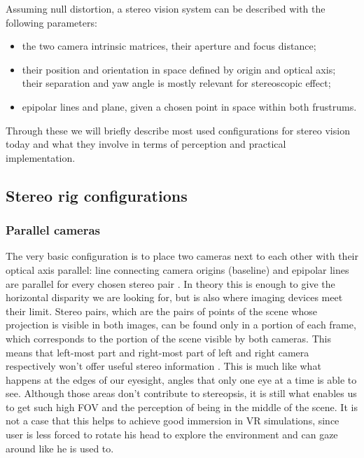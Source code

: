 Assuming null distortion, a stereo vision system can be described \cite{book_cv} with the following parameters:
\begin{itemize}
\item the two camera intrinsic matrices, their aperture and focus distance;
\item their position and orientation in space defined by origin and optical axis; their separation and yaw angle is mostly relevant for stereoscopic effect;
\item epipolar lines and plane, given a chosen point in space within both frustrums.
\end{itemize}
Through these we will briefly describe most used configurations for stereo vision today and what they involve in terms of perception and practical implementation.

\subsection{Stereo rig configurations}

\subsubsection{Parallel cameras}
The very basic configuration is to place two cameras next to each other with their optical axis parallel: line connecting camera origins (baseline) and epipolar lines are parallel for every chosen stereo pair \cite{stereoscopic_3D_acquisition}. In theory this is enough to give the horizontal disparity we are looking for, but is also where imaging devices meet their limit. Stereo pairs, which are the pairs of points of the scene whose projection is visible in both images, can be found only in a portion of each frame, which corresponds to the portion of the scene visible by both cameras. This means that left-most part and right-most part of left and right camera respectively won't offer useful stereo information \cite{correct_stereo_pairs}. This is much like what happens at the edges of our eyesight, angles that only one eye at a time is able to see. Although those areas don't contribute to stereopsis, it is still what enables us to get such high FOV and the perception of being in the middle of the scene. It is not a case that this helps to achieve good immersion in VR simulations, since user is less forced to rotate his head to explore the environment and can gaze around like he is used to.

